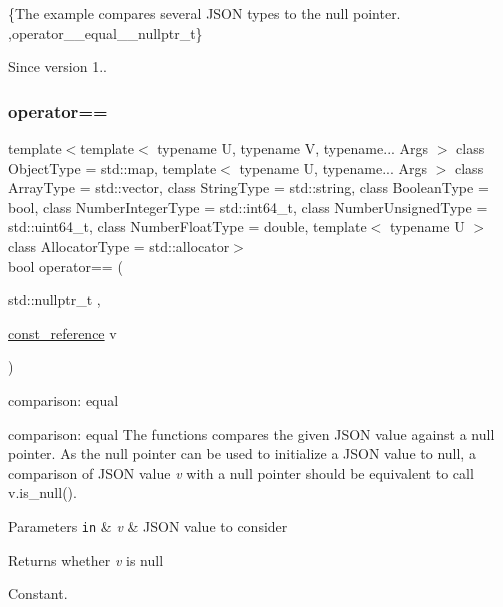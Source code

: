 \{The example compares several J\+S\+ON types to the null pointer. ,operator\+\_\+\+\_\+equal\+\_\+\+\_\+nullptr\+\_\+t\}

\begin{DoxySince}{Since}
version 1.. 
\end{DoxySince}
\hypertarget{classnlohmann_1_1basic__json_a98e05a2c9b8f74bd60442772cddeee52}{}\label{classnlohmann_1_1basic__json_a98e05a2c9b8f74bd60442772cddeee52} 
\subsubsection{\texorpdfstring{operator==}{operator==}\hspace{0.1cm}{\footnotesize\ttfamily [3/3]}}
{\footnotesize\ttfamily template$<$template$<$ typename U, typename V, typename... Args $>$ class Object\+Type = std\+::map, template$<$ typename U, typename... Args $>$ class Array\+Type = std\+::vector, class String\+Type  = std\+::string, class Boolean\+Type  = bool, class Number\+Integer\+Type  = std\+::int64\+\_\+t, class Number\+Unsigned\+Type  = std\+::uint64\+\_\+t, class Number\+Float\+Type  = double, template$<$ typename U $>$ class Allocator\+Type = std\+::allocator$>$ \\
bool operator== (\begin{DoxyParamCaption}\item[{std\+::nullptr\+\_\+t}]{,  }\item[{\hyperlink{classnlohmann_1_1basic__json_af677a29b0e66edc9f66e5167e4667071}{const\+\_\+reference}}]{v }\end{DoxyParamCaption})\hspace{0.3cm}{\ttfamily [friend]}}



comparison\+: equal 

comparison\+: equal The functions compares the given J\+S\+ON value against a null pointer. As the null pointer can be used to initialize a J\+S\+ON value to null, a comparison of J\+S\+ON value {\itshape v} with a null pointer should be equivalent to call {\ttfamily v.\+is\+\_\+null()}.


\begin{DoxyParams}[1]{Parameters}
\mbox{\tt in}  & {\em v} & J\+S\+ON value to consider \\
\hline
\end{DoxyParams}
\begin{DoxyReturn}{Returns}
whether {\itshape v} is null
\end{DoxyReturn}
Constant.


